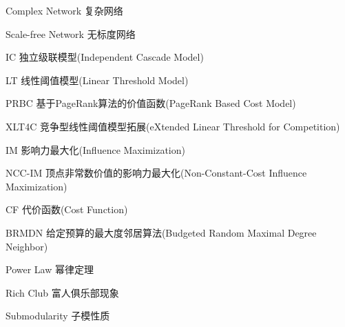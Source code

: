 \begin{denotation}

\item[Complex Network] 复杂网络
\item[Scale-free Network] 无标度网络
\item[IC] 独立级联模型(Independent Cascade Model)
\item[LT] 线性阈值模型(Linear Threshold Model)
\item[PRBC] 基于PageRank算法的价值函数(PageRank Based Cost Model)
\item[XLT4C] 竞争型线性阈值模型拓展(eXtended Linear Threshold for Competition)
\item[IM] 影响力最大化(Influence Maximization)
\item[NCC-IM] 顶点非常数价值的影响力最大化(Non-Constant-Cost Influence Maximization)
\item[CF] 代价函数(Cost Function)
\item[BRMDN] 给定预算的最大度邻居算法(Budgeted Random Maximal Degree Neighbor)
\item[Power Law] 幂律定理
\item[Rich Club] 富人俱乐部现象
\item[Submodularity] 子模性质


\end{denotation}
